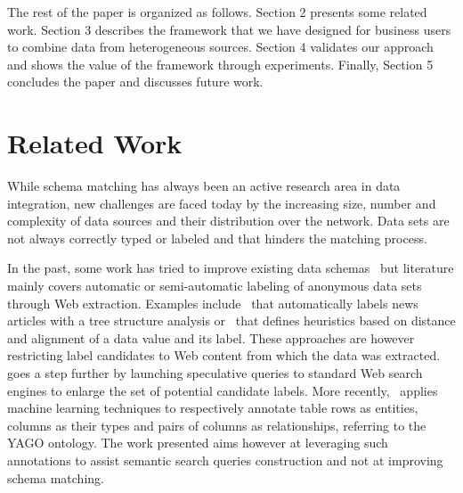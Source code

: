 \documentclass{sig-alternate}
\begin{document}
The rest of the paper is organized as follows. Section 2 presents some related work. Section 3 describes the framework that we have designed for business users to combine data from heterogeneous sources. Section 4 validates our approach and shows the value of the framework through experiments. Finally, Section 5 concludes the paper and discusses future work.


\section{Related Work}

While schema matching has always been an active research area in data integration, new challenges are faced today by the increasing size, number and complexity of data sources and their distribution over the network. Data sets are not always correctly typed or labeled and that hinders the matching process.

In the past, some work has tried to improve existing data schemas~\cite{ DBLP:journals/debu/MillerA03} but literature mainly covers automatic or semi-automatic labeling of anonymous data sets through Web extraction. Examples include~\cite{cas04} that automatically labels news articles with a tree structure analysis or~\cite{wang2003extraction} that defines heuristics based on distance and alignment of a data value and its label. These approaches are however restricting label candidates to Web content from which the data was extracted.~\cite{DBLP:conf/otm/SilvaBCS07} goes a step further by launching speculative queries to standard Web search engines to enlarge the set of potential candidate labels. More recently,~\cite{Limaye:2010:ASW:1920841.1921005} applies machine learning techniques to respectively annotate table rows as entities, columns as their types and pairs of columns as relationships, referring to the YAGO ontology. The work presented aims however at leveraging such annotations to assist semantic search queries construction and not at improving schema matching.
\end{document}
